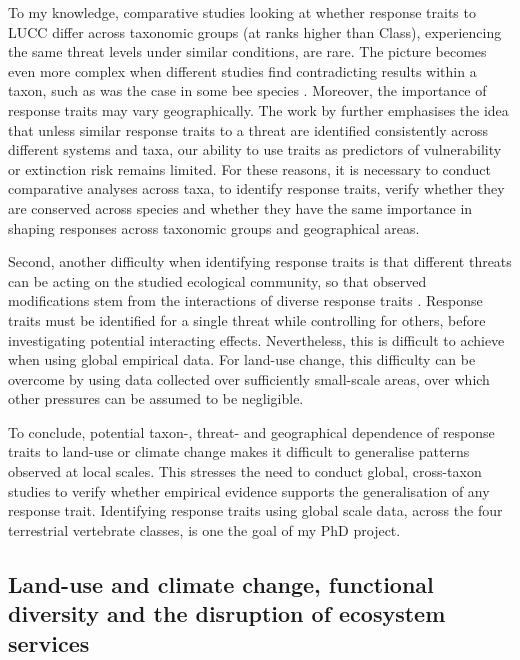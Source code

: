 To my knowledge, comparative studies looking at whether response traits to LUCC differ across taxonomic groups (at ranks higher than Class), experiencing the same threat levels under similar conditions, are rare. The picture becomes even more complex when different studies find contradicting results within a taxon, such as was the case in some bee species \citep{Bartomeus2018}. Moreover, the importance of response traits may vary geographically. The work by \citet{Bartomeus2018} further emphasises the idea that unless similar response traits to a threat are identified consistently across different systems and taxa, our ability to use traits as predictors of vulnerability or extinction risk remains limited. For these reasons, it is necessary to conduct comparative analyses across taxa, to identify response traits, verify whether they are conserved across species and whether they have the same importance in shaping responses across taxonomic groups and geographical areas. 

Second, another difficulty when identifying response traits is that different threats can be acting on the studied ecological community, so that observed modifications stem from the interactions of diverse response traits \citep{Gonzalez-Suarez2013}. Response traits must be identified for a single threat while controlling for others, before investigating potential interacting effects. Nevertheless, this is difficult to achieve when using global empirical data.  For land-use change, this difficulty can be overcome by using data collected over sufficiently small-scale areas, over which other pressures can be assumed to be negligible. 

To conclude, potential taxon-, threat- and geographical dependence of response traits to land-use or climate change makes it difficult to generalise patterns observed at local scales. This stresses the need to conduct global, cross-taxon studies to verify whether empirical evidence supports the generalisation of any response trait. Identifying response traits using global scale data, across the four terrestrial vertebrate classes, is one the goal of my PhD project.

\subsection{Land-use and climate change, functional diversity and the disruption of ecosystem services}

